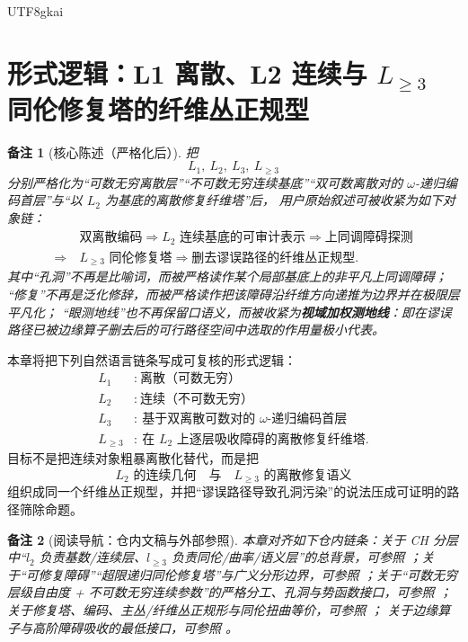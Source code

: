 \documentclass[12pt]{article}
\newtheorem{remark}{备注}[section]
\begin{document}
\begin{CJK*}{UTF8}{gkai}
\section{形式逻辑：L1 离散、L2 连续与 $L_{\ge 3}$ 同伦修复塔的纤维丛正规型}
\label{sec:tex41-ch1}

\begin{remark}[核心陈述（严格化后）]
把
\[
L_1,\ L_2,\ L_3,\ L_{\ge 3}
\]
分别严格化为“可数无穷离散层”“不可数无穷连续基底”“双可数离散对的 $\omega$-递归编码首层”与“以 $L_2$ 为基底的离散修复纤维塔”后，
用户原始叙述可被收紧为如下对象链：
\[
\begin{aligned}
  &\text{双离散编码}
  \Longrightarrow
  \text{$L_2$ 连续基底的可审计表示}
  \Longrightarrow
  \text{上同调障碍探测}\\
  \Longrightarrow\ &
  \text{$L_{\ge 3}$ 同伦修复塔}
  \Longrightarrow
  \text{删去谬误路径的纤维丛正规型}.
\end{aligned}
\]
其中“孔洞”不再是比喻词，而被严格读作某个局部基底上的非平凡上同调障碍；
“修复”不再是泛化修辞，而被严格读作把该障碍沿纤维方向递推为边界并在极限层平凡化；
“眼测地线”也不再保留口语义，而被收紧为\textbf{视域加权测地线}：即在谬误路径已被边缘算子删去后的可行路径空间中选取的作用量极小代表。
\end{remark}

本章将把下列自然语言链条写成可复核的形式逻辑：
\[
  \begin{aligned}
    L_1&:\ \text{离散（可数无穷）}\\
    L_2&:\ \text{连续（不可数无穷）}\\
    L_3&:\ \text{基于双离散可数对的 $\omega$-递归编码首层}\\
    L_{\ge 3}&:\ \text{在 $L_2$ 上逐层吸收障碍的离散修复纤维塔}.
  \end{aligned}
\]
目标不是把连续对象粗暴离散化替代，而是把
\[
\text{$L_2$ 的连续几何}
\quad\text{与}\quad
\text{$L_{\ge 3}$ 的离散修复语义}
\]
组织成同一个纤维丛正规型，并把“谬误路径导致孔洞污染”的说法压成可证明的路径筛除命题。

\begin{remark}[阅读导航：仓内文稿与外部参照]
本章对齐如下仓内链条：关于 CH 分层中“$l_2$ 负责基数/连续层、$l_{\ge 3}$ 负责同伦/曲率/语义层”的总背景，可参照
\cite{GaoZheng2025GFramework}；关于“可修复障碍”“超限递归同伦修复塔”与广义分形边界，可参照
\cite{RepoTex29RepairableObstruction}；关于“可数无穷层级自由度 + 不可数无穷连续参数”的严格分工、孔洞与势函数接口，可参照
\cite{RepoTex32HoleObstruction}；关于修复塔、编码、主丛/纤维丛正规形与同伦扭曲等价，可参照
\cite{RepoTex35ExtendedCertificationTower,RepoTex36HomotopyTwistBijection,RepoTex37SemanticGaugeRuntime}；
  关于边缘算子与高阶障碍吸收的最低接口，可参照
\cite{RepoNB17EdgeOperator}。


\end{remark}
\end{CJK*}
\end{document}
